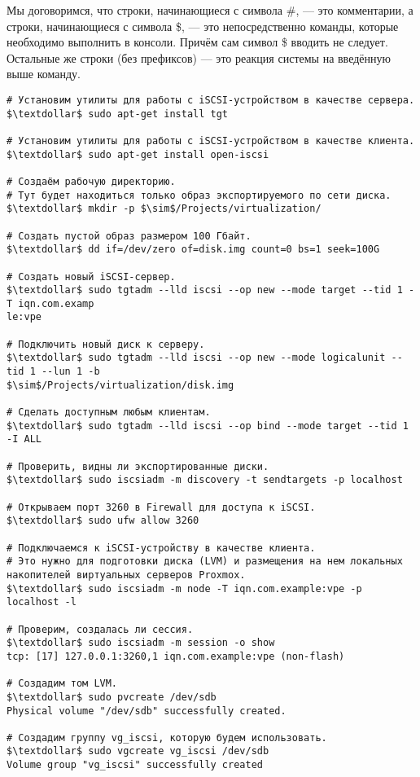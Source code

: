 \documentclass[14pt, a4paper]{article}
\begin{document}
Мы договоримся, что строки, начинающиеся с символа \#, — это комментарии, а строки,
начинающиеся с символа \$, — это непосредственно команды, которые необходимо выполнить в
консоли. Причём сам символ \$ вводить не следует. Остальные же строки (без префиксов) — это
реакция системы на введённую выше команду.
\newpage
\begin{lstlisting}
# Установим утилиты для работы с iSCSI-устройством в качестве сервера.
$\textdollar$ sudo apt-get install tgt
    
# Установим утилиты для работы с iSCSI-устройством в качестве клиента.
$\textdollar$ sudo apt-get install open-iscsi
    
# Создаём рабочую директорию.
# Тут будет находиться только образ экспортируемого по сети диска.
$\textdollar$ mkdir -p $\sim$/Projects/virtualization/
    
# Создать пустой образ размером 100 Гбайт.
$\textdollar$ dd if=/dev/zero of=disk.img count=0 bs=1 seek=100G
       
# Создать новый iSCSI-сервер.
$\textdollar$ sudo tgtadm --lld iscsi --op new --mode target --tid 1 -T iqn.com.examp
le:vpe
 
# Подключить новый диск к серверу.
$\textdollar$ sudo tgtadm --lld iscsi --op new --mode logicalunit --tid 1 --lun 1 -b
$\sim$/Projects/virtualization/disk.img
    
# Сделать доступным любым клиентам.
$\textdollar$ sudo tgtadm --lld iscsi --op bind --mode target --tid 1 -I ALL

# Проверить, видны ли экспортированные диски.
$\textdollar$ sudo iscsiadm -m discovery -t sendtargets -p localhost

# Открываем порт 3260 в Firewall для доступа к iSCSI.
$\textdollar$ sudo ufw allow 3260

# Подключаемся к iSCSI-устройству в качестве клиента.
# Это нужно для подготовки диска (LVM) и размещения на нем локальных 
накопителей виртуальных серверов Proxmox.
$\textdollar$ sudo iscsiadm -m node -T iqn.com.example:vpe -p localhost -l

# Проверим, создалась ли сессия.
$\textdollar$ sudo iscsiadm -m session -o show
tcp: [17] 127.0.0.1:3260,1 iqn.com.example:vpe (non-flash)

# Создадим том LVM.
$\textdollar$ sudo pvcreate /dev/sdb
Physical volume "/dev/sdb" successfully created.

# Создадим группу vg_iscsi, которую будем использовать.
$\textdollar$ sudo vgcreate vg_iscsi /dev/sdb
Volume group "vg_iscsi" successfully created
\end{lstlisting}
\vspace{0.2cm}
\end{document}
